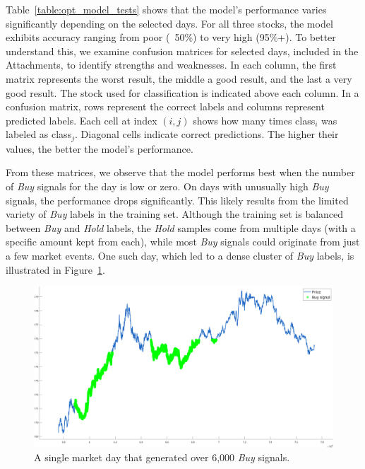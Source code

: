 \documentclass[a4paper,oneside,onecolumn,12pt]{book}
\begin{document}
		Table~\ref{table:opt_model_tests} shows that the model's performance varies significantly depending on the selected days. For all three stocks, the model exhibits accuracy ranging from poor (~50\%) to very high (95\%+). To better understand this, we examine confusion matrices for selected days, included in the Attachments, to identify strengths and weaknesses. In each column, the first matrix represents the worst result, the middle a good result, and the last a very good result. The stock used for classification is indicated above each column. In a confusion matrix, rows represent the correct labels and columns represent predicted labels. Each cell at index $(i,j)$ shows how many times class$_i$ was labeled as class$_j$. Diagonal cells indicate correct predictions. The higher their values, the better the model's performance.

		From these matrices, we observe that the model performs best when the number of \textit{Buy} signals for the day is low or zero. On days with unusually high \textit{Buy} signals, the performance drops significantly. This likely results from the limited variety of \textit{Buy} labels in the training set. Although the training set is balanced between \textit{Buy} and \textit{Hold} labels, the \textit{Hold} samples come from multiple days (with a specific amount kept from each), while most \textit{Buy} signals could originate from just a few market events. One such day, which led to a dense cluster of \textit{Buy} labels, is illustrated in Figure~\ref{fig:buy_heavy_event}.

		\begin{figure}[H]
		\begin{center}
			\includegraphics[width=\linewidth]{kep/buy_heavy_event.png}
			\caption{A single market day that generated over 6,000 \textit{Buy} signals.}
			\label{fig:buy_heavy_event}
		\end{center}
		\end{figure}
\end{document}
